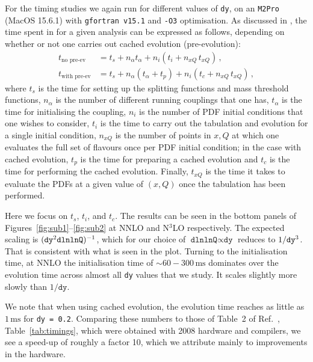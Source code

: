 For the timing studies we again run \hoppet{} for different values of
\texttt{dy}, on an \texttt{M2Pro} (MacOS 15.6.1) with \texttt{gfortran v15.1} and
\texttt{-O3} optimisation.
%
As discussed in \cite{Salam:2008qg}, the time spent in \hoppet for a
given analysis can be expressed as follows, depending on whether or
not one carries out cached evolution (pre-evolution):
\begin{subequations}
  \label{eq:timing-v2}
  \begin{align}
    t_\text{no pre-ev}   &= t_s + n_\alpha t_\alpha + n_i (t_i  + n_{xQ}\, t_{xQ})\,,\\
    t_\text{with pre-ev} &= t_s + n_\alpha (t_\alpha + t_p) + n_i (t_c + n_{xQ}\,
    t_{xQ})\,,
  \end{align}
\end{subequations}
where $t_s$ is the time for setting up the splitting functions and
mass threshold functions, $n_\alpha$ is the number of different
running couplings that one has, $t_\alpha$ is the time for
initialising the coupling,
%
$n_i$ is the number of PDF initial conditions that one wishes to
consider, $t_i$ is the time to carry out the tabulation and evolution
for a single initial condition, $n_{xQ}$ is the number of points in
$x,Q$ at which one evaluates the full set of flavours once per PDF
initial condition; in the case with cached evolution, $t_p$ is the
time for preparing a cached evolution and $t_c$ is the time for
performing the cached evolution. Finally, $t_{xQ}$ is the time it takes
to evaluate the PDFs at a given value of $(x,Q)$ once the tabulation
has been performed.

Here we focus on $t_s$, $t_i$, and $t_c$. The results can be seen in the
bottom panels of Figures~\ref{fig:sub1}--\ref{fig:sub2} at NNLO and
N$^3$LO respectively.
%
The expected scaling is
$(\text{\texttt{dy}}^2 \text{\texttt{dlnlnQ}})^{-1}$, which for our
choice of $\texttt{dlnlnQ} \propto\texttt{dy}$ reduces to
$1/\text{\texttt{dy}}^3$.
%
That is consistent with what is seen in the plot.
%
Turning to the initialisation time, at NNLO the initialisation time of
$\sim 60-300\,\mathrm{ms}$ dominates over the evolution time across
almost all \texttt{dy} values that we study.
%
It scales slightly more slowly than $1/\texttt{dy}$.

We note that when using cached evolution, the evolution time reaches as
little as $1\,\mathrm{ms}$ for \texttt{dy = 0.2}.
%
Comparing these numbers to those of  
%
\ifreleasenote
Table~2 of Ref.~\cite{Salam:2008qg},
\else
Table~\ref{tab:timings},
\fi
%
which were obtained with 2008 hardware and compilers, we see a
speed-up of roughly a factor 10, which we attribute mainly to
improvements in the hardware.

